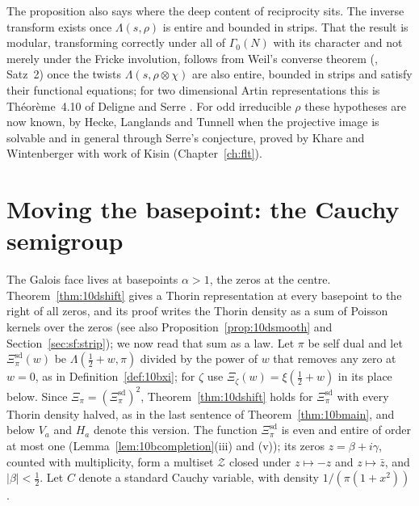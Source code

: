 The proposition also says where the deep content of reciprocity sits. The inverse transform exists once $\Lambda(s,\rho)$ is entire and bounded in strips. That the result is modular, transforming correctly under all of $\Gamma_0(N)$ with its character and not merely under the Fricke involution, follows from Weil's converse theorem (\cite{weil1967}, Satz~2) once the twists $\Lambda(s,\rho\otimes\chi)$ are also entire, bounded in strips and satisfy their functional equations; for two dimensional Artin representations this is Th\'eor\`eme~4.10 of Deligne and Serre \cite{deligneserre1974}. For odd irreducible $\rho$ these hypotheses are now known, by Hecke, Langlands and Tunnell \cite{langlands1980,tunnell1981} when the projective image is solvable and in general through Serre's conjecture, proved by Khare and Wintenberger \cite{kharewintenberger2009,kharewintenberger2009b} with work of Kisin \cite{kisin2009} (Chapter~\ref{ch:flt}).

\section{Moving the basepoint: the Cauchy semigroup}\label{sec:lapcauchy}

The Galois face lives at basepoints $\alpha>1$, the zeros at the centre. Theorem~\ref{thm:10dshift} gives a Thorin representation at every basepoint to the right of all zeros, and its proof writes the Thorin density as a sum of Poisson kernels over the zeros (see also Proposition~\ref{prop:10dsmooth} and Section~\ref{sec:sf:strip}); we now read that sum as a law. Let $\pi$ be self dual and let $\Xi^{\mathrm{sd}}_\pi(w)$ be $\Lambda(\frac12+w,\pi)$ divided by the power of $w$ that removes any zero at $w=0$, as in Definition~\ref{def:10bxi}; for $\zeta$ use $\Xi_\zeta(w)=\xi(\frac12+w)$ in its place below. Since $\Xi_\pi=(\Xi^{\mathrm{sd}}_\pi)^2$, Theorem~\ref{thm:10dshift} holds for $\Xi^{\mathrm{sd}}_\pi$ with every Thorin density halved, as in the last sentence of Theorem~\ref{thm:10bmain}, and below $V_a$ and $H_a$ denote this version. The function $\Xi^{\mathrm{sd}}_\pi$ is even and entire of order at most one (Lemma~\ref{lem:10bcompletion}(iii) and (v)); its zeros $z=\beta+i\gamma$, counted with multiplicity, form a multiset $\mathcal Z$ closed under $z\mapsto-z$ and $z\mapsto\bar z$, and $|\beta|<\frac12$. Let $C$ denote a standard Cauchy variable, with density $1/(\pi(1+x^2))$.

